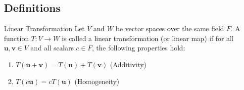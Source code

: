 \documentclass[openany]{book}
\begin{document}
\subsection{Definitions}
\begin{mydefinition}{Linear Transformation}
    Let $V$ and $W$ be vector spaces over the same field $F$. A function $T: V \to W$ is called a linear transformation (or linear map) if for all $\mathbf{u}, \mathbf{v} \in V$ and all scalars $c \in F$, the following properties hold:
    \begin{enumerate}
        \item $T(\mathbf{u} + \mathbf{v}) = T(\mathbf{u}) + T(\mathbf{v})$ (Additivity)
        \item $T(c\mathbf{u}) = cT(\mathbf{u})$ (Homogeneity)
    \end{enumerate}
\end{mydefinition}
\end{document}
